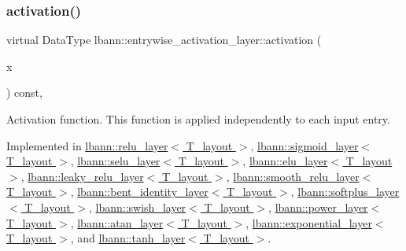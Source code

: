 \subsubsection{\texorpdfstring{activation()}{activation()}}
{\footnotesize\ttfamily virtual Data\+Type lbann\+::entrywise\+\_\+activation\+\_\+layer\+::activation (\begin{DoxyParamCaption}\item[{Data\+Type}]{x }\end{DoxyParamCaption}) const\hspace{0.3cm}{\ttfamily [protected]}, {}}

Activation function. This function is applied independently to each input entry. 

Implemented in \hyperlink{classlbann_1_1relu__layer_a24c9b5e006e4a0b3f8992c1c44ce9ba5}{lbann\+::relu\+\_\+layer$<$ T\+\_\+layout $>$}, \hyperlink{classlbann_1_1sigmoid__layer_ab6a237e0a10be2599474dcd2cd73e767}{lbann\+::sigmoid\+\_\+layer$<$ T\+\_\+layout $>$}, \hyperlink{classlbann_1_1selu__layer_a266c894e3e1ed4028c1acfe671773524}{lbann\+::selu\+\_\+layer$<$ T\+\_\+layout $>$}, \hyperlink{classlbann_1_1elu__layer_a36412ea7156d5c433e31681e70222ad6}{lbann\+::elu\+\_\+layer$<$ T\+\_\+layout $>$}, \hyperlink{classlbann_1_1leaky__relu__layer_a173d09aa2c6d699634b2ef64a5952ba9}{lbann\+::leaky\+\_\+relu\+\_\+layer$<$ T\+\_\+layout $>$}, \hyperlink{classlbann_1_1smooth__relu__layer_a7fa882bb89a244a5a4ccb6614815f1c6}{lbann\+::smooth\+\_\+relu\+\_\+layer$<$ T\+\_\+layout $>$}, \hyperlink{classlbann_1_1bent__identity__layer_a496012ccbb6601afb8de972e943d7942}{lbann\+::bent\+\_\+identity\+\_\+layer$<$ T\+\_\+layout $>$}, \hyperlink{classlbann_1_1softplus__layer_aff73da03e891b4ea54d5ffc0618425b4}{lbann\+::softplus\+\_\+layer$<$ T\+\_\+layout $>$}, \hyperlink{classlbann_1_1swish__layer_aeab50ff2ad06d89a54953efdf7c09ed4}{lbann\+::swish\+\_\+layer$<$ T\+\_\+layout $>$}, \hyperlink{classlbann_1_1power__layer_ad7b7265367e2623fcd242920737a3acb}{lbann\+::power\+\_\+layer$<$ T\+\_\+layout $>$}, \hyperlink{classlbann_1_1atan__layer_acb40bcd43b2c974b1355a93aea1c5290}{lbann\+::atan\+\_\+layer$<$ T\+\_\+layout $>$}, \hyperlink{classlbann_1_1exponential__layer_a7e1a5b088bb129b065dd01438e6604af}{lbann\+::exponential\+\_\+layer$<$ T\+\_\+layout $>$}, and \hyperlink{classlbann_1_1tanh__layer_a48df029cc99589384dec7de3d7d77ad0}{lbann\+::tanh\+\_\+layer$<$ T\+\_\+layout $>$}.

\mbox{\label{classlbann_1_1entrywise__activation__layer_a7676a4c5060452a38264993554e79f8e}} 
